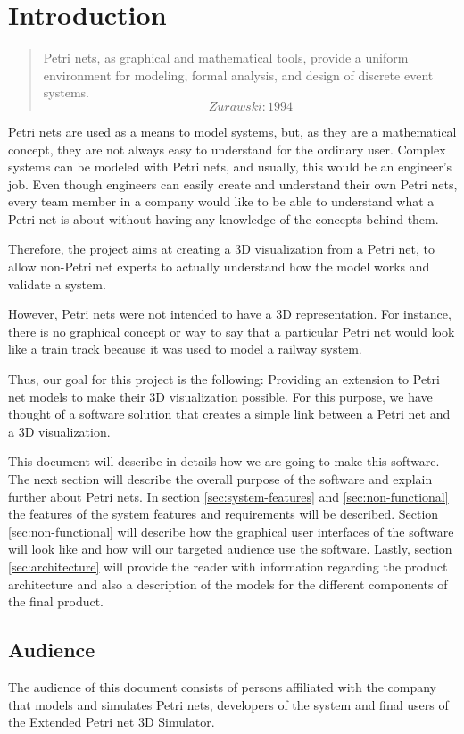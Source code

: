 \section{Introduction}

\begin{quotation}
Petri nets, as graphical and mathematical tools, provide a uniform environment for modeling, formal analysis, and design of discrete event systems. \[Zurawski:1994\]
\end{quotation}

Petri nets are used as a means to model systems, but, as they are a mathematical concept, they are not always easy to understand for the ordinary user. Complex systems can be modeled with Petri nets, and usually, this would be an engineer's job. Even though engineers can easily create and understand their own Petri nets, every team member in a company would like to be able to understand what a Petri net is about without having any knowledge of the concepts behind them.

Therefore, the project aims at creating a 3D visualization from a Petri net, to allow non-Petri net experts to actually understand how the model works and validate a system.

However, Petri nets were not intended to have a 3D representation. For instance, there is no graphical concept or way to say that a particular Petri net would look like a train track because it was used to model a railway system. 

Thus, our goal for this project is the following: Providing an extension to Petri net models to make their 3D visualization possible. For this purpose, we have thought of a software solution that creates a simple link between a Petri net and a 3D visualization.

This document will describe in details how we are going to make this software. The next section will describe the overall purpose of the software and explain further about Petri nets. In section \ref{sec:system-features} and \ref{sec:non-functional} the features of the system features and requirements will be described. Section \ref{sec:non-functional} will describe how the graphical user interfaces of the software will look like and how will our targeted audience use the software. Lastly, section \ref{sec:architecture} will provide the reader with information regarding the product architecture and also a description of the models for the different components of the final product. 

\subsection{Audience}

The audience of this document consists of persons affiliated with the company that models and simulates Petri nets, developers of the system and final users of the Extended Petri net 3D Simulator.
